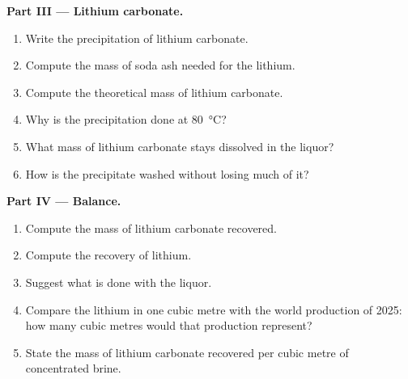 \begin{problem}
\medskip
\noindent\textbf{Part III --- Lithium carbonate.}
\begin{enumerate}[resume]
  \item Write the precipitation of lithium carbonate.
  \item Compute the mass of soda ash needed for the lithium.
  \item Compute the theoretical mass of lithium carbonate.
  \item Why is the precipitation done at \qty{80}{\celsius}?
  \item What mass of lithium carbonate stays dissolved in the liquor?
  \item How is the precipitate washed without losing much of it?
\end{enumerate}

\medskip
\noindent\textbf{Part IV --- Balance.}
\begin{enumerate}[resume]
  \item Compute the mass of lithium carbonate recovered.
  \item Compute the recovery of lithium.
  \item Suggest what is done with the liquor.
  \item Compare the lithium in one cubic metre with the world production
        of 2025: how many cubic metres would that production represent?
  \item State the mass of lithium carbonate recovered per cubic metre of
        concentrated brine.
\end{enumerate}
\end{problem}
